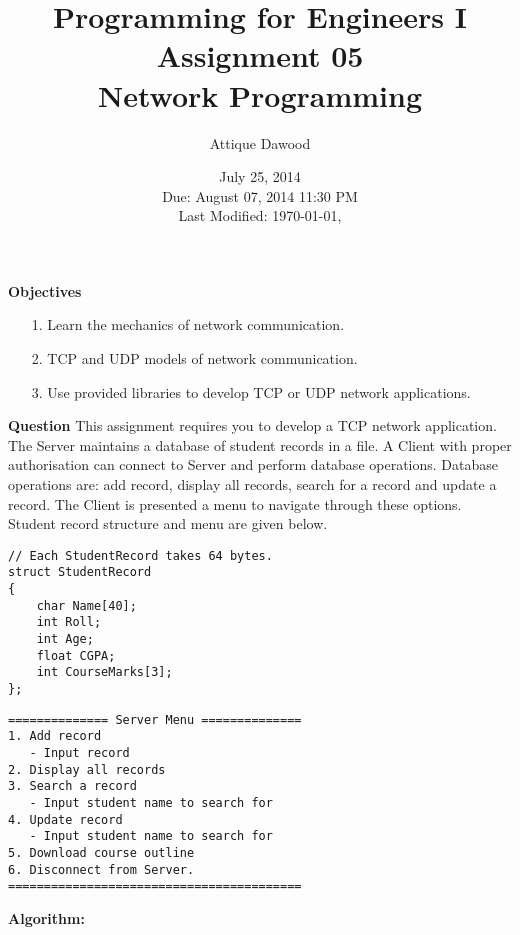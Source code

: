 \documentclass[12pt,a4paper]{article}
\title{Programming for Engineers I\\Assignment 05\\Network Programming}
\author{Attique Dawood}
\date{July 25, 2014\\Due: August 07, 2014 11:30 PM\\[0.2cm] Last Modified: \today, \currenttime}
\begin{document}
\maketitle
\noindent\textbf{Objectives}
\begin{itemize}
\item[1.] Learn the mechanics of network communication.
\item[2.] TCP and UDP models of network communication.
\item[3.] Use provided libraries to develop TCP or UDP network applications.
\end{itemize}
\noindent\textbf{Question} This assignment requires you to develop a TCP network application. The Server maintains a database of student records in a file. A Client with proper authorisation can connect to Server and perform database operations. Database operations are: add record, display all records, search for a record and update a record. The Client is presented a menu to navigate through these options. Student record structure and menu are given below.
\begin{verbatim}
// Each StudentRecord takes 64 bytes.
struct StudentRecord
{
    char Name[40];
  	int Roll;
    int Age;
    float CGPA;
    int CourseMarks[3];
};
\end{verbatim}
\begin{verbatim}
============== Server Menu ==============
1. Add record
   - Input record
2. Display all records
3. Search a record
   - Input student name to search for
4. Update record
   - Input student name to search for
5. Download course outline
6. Disconnect from Server.
=========================================
\end{verbatim}
\newpage
\noindent\textbf{Algorithm:}
\end{document}
